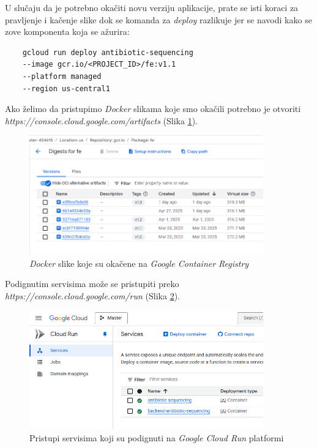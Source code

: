 \documentclass[12pt,oneside]{memoir}
\begin{document}
U slučaju da je potrebno okačiti novu verziju aplikacije, prate se isti koraci za pravljenje i kačenje slike dok se komanda za \emph{deploy} razlikuje jer se navodi kako se zove komponenta koja se ažurira:
\begin{verbatim}
    gcloud run deploy antibiotic-sequencing 
    --image gcr.io/<PROJECT_ID>/fe:v1.1 
    --platform managed 
    --region us-central1
\end{verbatim}

Ako želimo da pristupimo \emph{Docker} slikama koje smo okačili potrebno je otvoriti \emph{https://console.cloud.google.com/artifacts} (Slika \ref{fig:gcr_images}).
\begin{figure}[h]
\centering
\includegraphics[width=0.9\textwidth]{images/gcr_images.png}
\caption{\emph{Docker} slike koje su okačene na \emph{Google Container Registry}}
\label{fig:gcr_images}
\end{figure}

Podignutim servisima može se pristupiti preko \emph{https://console.cloud.google.com/run} (Slika \ref{fig:gcr_services}).

\begin{figure}[h]
\centering
\includegraphics[width=0.9\textwidth]{images/gcr_services.png}
\caption{Pristupi servisima koji su podignuti na \emph{Google Cloud Run} platformi}
\label{fig:gcr_services}
\end{figure}
\end{document}
